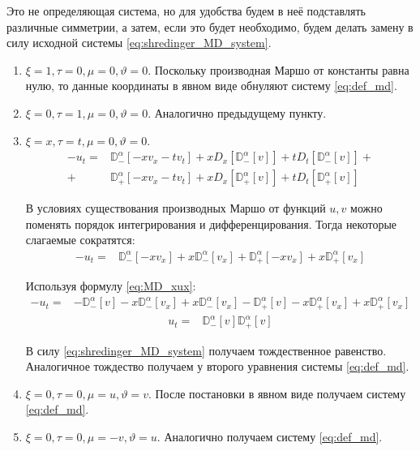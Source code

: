 \documentclass[a4paper, fontsize=14pt]{article}
\newcommand{\MD}[2]{\mathbb{D}_{#1}^{\alpha}[#2]} %
\newcommand{\D}[3]{D_{#1}^{#2} \left[ #3 \right]} %
\begin{document}
Это не определяющая система, но для удобства будем в неё подставлять различные симметрии, а затем, если это будет необходимо, будем делать замену в силу исходной системы \eqref{eq:shredinger_MD_system}.
\begin{enumerate}
  \item $\xi = 1, \tau = 0, \mu = 0, \vartheta = 0$. Поскольку производная Маршо от константы равна нулю, то данные координаты в явном виде обнуляют систему \eqref{eq:def_md}.
  \item $\xi = 0, \tau = 1, \mu = 0, \vartheta = 0$. Аналогично предыдущему пункту.
  \item $\xi = x, \tau = t, \mu = 0, \vartheta = 0$.
        \begin{equation*}
          \begin{aligned}
            -u_t = & \MD{-}{-x v_x - t v_t} + x \D{x}{}{\MD{-}{v}} + t \D{t}{}{\MD{-}{v}} + \\
            +      & \MD{+}{-x v_x - t v_t} + x \D{x}{}{\MD{+}{v}} + t \D{t}{}{\MD{+}{v}}
          \end{aligned}
        \end{equation*}

        В условиях существования производных Маршо от функций $u, v$  можно поменять порядок интегрирования и дифференцирования. Тогда некоторые слагаемые сократятся:
        \begin{equation*}
          \begin{aligned}
            -u_t = & \MD{-}{-x v_x} + x \MD{-}{v_x} + \MD{+}{-x v_x} + x \MD{+}{v_x}
          \end{aligned}
        \end{equation*}

        Используя формулу \eqref{eq:MD_xux}:
        \begin{equation*}
          \begin{aligned}
            -u_t = & - \MD{-}{v} - x \MD{-}{v_x} + x \MD{-}{v_x} - \MD{+}{v} - x \MD{+}{v_x} + x \MD{+}{v_x}
          \end{aligned}
        \end{equation*}
        \begin{equation*}
          \begin{aligned}
            u_t = & \MD{-}{v} \MD{+}{v}
          \end{aligned}
        \end{equation*}

        В силу \eqref{eq:shredinger_MD_system} получаем тождественное равенство.
        Аналогичное тождество получаем у второго уравнения системы \eqref{eq:def_md}.

  \item $\xi = 0, \tau = 0, \mu = u, \vartheta = v$. После постановки в явном виде получаем систему \eqref{eq:def_md}.
  \item $\xi = 0, \tau = 0, \mu = -v, \vartheta = u$. Аналогично получаем систему \eqref{eq:def_md}.
\end{enumerate}
\end{document}

